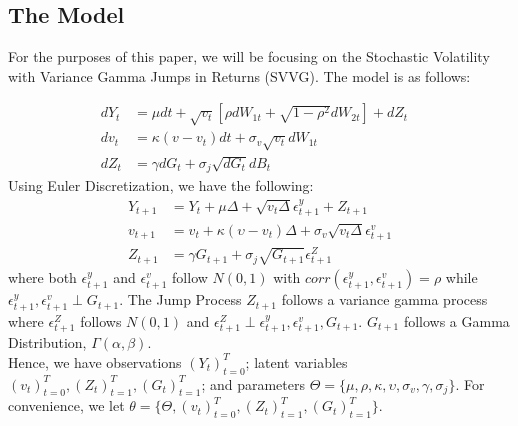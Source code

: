 \documentclass[11pt]{article}
\theoremstyle{definition}
\begin{document}
\subsection{The Model}
For the purposes of this paper, we will be focusing on the Stochastic Volatility with Variance Gamma Jumps in Returns (SVVG). The model is as follows:

\begin{equation}
	\begin{aligned}
		dY_{t} &=\mu dt+\sqrt{v_{t}}[\rho dW_{1t}+\sqrt{1-\rho ^{2}} dW_{2t}] + dZ_{t} &\\
		dv_{t} &= \kappa (v - v_{t})dt+\sigma _{v}\sqrt{v_{t}}dW_{1t} &\\
		dZ_{t} &= \gamma dG_{t} + \sigma _{j} \sqrt{dG_{t}}dB_{t}
	\end{aligned}
\end{equation}
Using Euler Discretization, we have the following:
\begin{equation}
	\begin{aligned}
		Y_{t+1} &= Y_{t} + \mu\Delta + \sqrt{v_{t}\Delta}\epsilon_{t+1}^{y}+Z_{t+1}\\
		v_{t+1} &= v_{t} + \kappa(\upsilon - v_{t})\Delta + \sigma_{v}\sqrt{v_{t}\Delta}\epsilon_{t+1}^{v}\\
		Z_{t+1} &= \gamma G_{t+1} + \sigma_{j}\sqrt{G_{t+1}}\epsilon_{t+1}^{Z}
	\end{aligned}
\end{equation}
where both $\epsilon_{t+1}^{y}$ and $\epsilon_{t+1}^{v}$ follow $N(0,1)$ with $corr(\epsilon_{t+1}^{y},\epsilon_{t+1}^{v})=\rho$ while $\epsilon_{t+1}^{y},\epsilon_{t+1}^{v} \perp G_{t+1}$. The Jump Process $Z_{t+1}$ follows a variance gamma process where $\epsilon_{t+1}^{Z}$ follows $N(0,1)$ and $\epsilon_{t+1}^{Z} \perp \epsilon_{t+1}^{y},\epsilon_{t+1}^{v},G_{t+1}$. $G_{t+1}$ follows a Gamma Distribution, $\Gamma (\alpha,\beta)$.\\
Hence, we have observations $(Y_{t})_{t=0}^{T}$; latent variables $(v_{t})_{t=0}^{T},(Z_{t})_{t=1}^{T},(G_{t})_{t=1}^{T}$; and parameters $\Theta = \{\mu,\rho,\kappa,\upsilon,\sigma_{v},\gamma,\sigma_{j}\}$. For convenience, we let $\theta = \{\Theta,(v_{t})_{t=0}^{T},(Z_{t})_{t=1}^{T},(G_{t})_{t=1}^{T} \}$.
\end{document}
